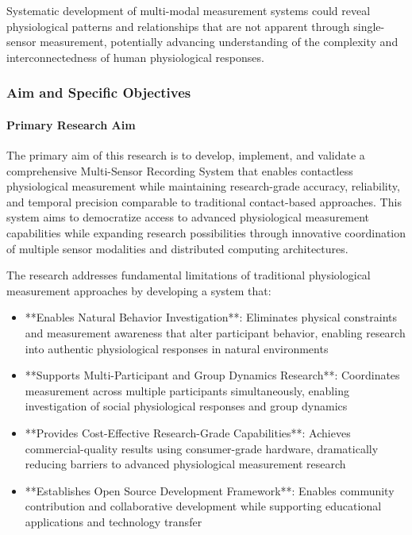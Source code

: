 \documentclass[12pt,a4paper]{article}
\begin{document}
Systematic development of multi-modal measurement systems could reveal physiological patterns and relationships that are
not apparent through single-sensor measurement, potentially advancing understanding of the complexity and
interconnectedness of human physiological responses.

\subsubsection{Aim and Specific Objectives}

\paragraph{Primary Research Aim}

The primary aim of this research is to develop, implement, and validate a comprehensive Multi-Sensor Recording System
that enables contactless physiological measurement while maintaining research-grade accuracy, reliability, and temporal
precision comparable to traditional contact-based approaches. This system aims to democratize access to advanced
physiological measurement capabilities while expanding research possibilities through innovative coordination of
multiple sensor modalities and distributed computing architectures.

The research addresses fundamental limitations of traditional physiological measurement approaches by developing a
system that:

\begin{itemize}
\item **Enables Natural Behavior Investigation**: Eliminates physical constraints and measurement awareness that alter
  participant behavior, enabling research into authentic physiological responses in natural environments
\item **Supports Multi-Participant and Group Dynamics Research**: Coordinates measurement across multiple participants
  simultaneously, enabling investigation of social physiological responses and group dynamics
\item **Provides Cost-Effective Research-Grade Capabilities**: Achieves commercial-quality results using consumer-grade
  hardware, dramatically reducing barriers to advanced physiological measurement research
\item **Establishes Open Source Development Framework**: Enables community contribution and collaborative development while
  supporting educational applications and technology transfer

\end{itemize}
\end{document}
